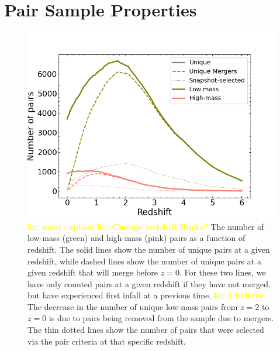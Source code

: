 \documentclass[twocolumn,linenumbers]{aastex631}
\newcommand{\kc}[1]{\textcolor{yellow}{\textbf{kc: #1}} }
\begin{document}


\section{Pair Sample Properties}
\begin{figure}[htb]
    \begin{center}
    \includegraphics[width=\columnwidth]{plots/bet-on-it/6_paircount.png}
    \caption{\kc{need caption}\kc{Change redshift limits?} The number of low-mass (green) and high-mass (pink) pairs as a function of redshift. The solid lines show the number of unique pairs at a given redshift, while dashed lines show the number of unique pairs at a given redshift that will merge before $z=0$.
    For these two lines, we have only counted pairs at a given redshift if they have not merged, but have experienced first infall at a previous time. 
    \kc{I believe} The decrease in the number of unique low-mass pairs from $z=2$ to $z=0$ is due to pairs being removed from the sample due to mergers.
    The thin dotted lines show the number of pairs that were selected via the pair criteria at that specific redshift. 
    }
    \label{fig:num-pairs}
    \end{center}
\end{figure}
\end{document}
